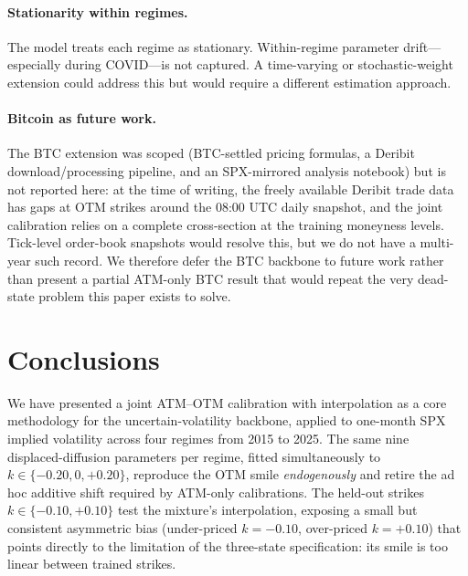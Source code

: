 \documentclass[12pt]{article}
\begin{document}
\paragraph{Stationarity within regimes.} The model treats each regime as stationary. Within-regime parameter drift---especially during COVID---is not captured. A time-varying or stochastic-weight extension could address this but would require a different estimation approach.

\paragraph{Bitcoin as future work.} The BTC extension was scoped (BTC-settled pricing formulas, a Deribit download/processing pipeline, and an SPX-mirrored analysis notebook) but is not reported here: at the time of writing, the freely available Deribit trade data has gaps at OTM strikes around the 08:00 UTC daily snapshot, and the joint calibration relies on a complete cross-section at the training moneyness levels. Tick-level order-book snapshots would resolve this, but we do not have a multi-year such record. We therefore defer the BTC backbone to future work rather than present a partial ATM-only BTC result that would repeat the very dead-state problem this paper exists to solve.


\section{Conclusions}
\label{sec:conclusion}

We have presented a joint ATM--OTM calibration with interpolation as a core methodology for the uncertain-volatility backbone, applied to one-month SPX implied volatility across four regimes from 2015 to 2025. The same nine displaced-diffusion parameters per regime, fitted simultaneously to $k \in \{-0.20, 0, +0.20\}$, reproduce the OTM smile \emph{endogenously} and retire the ad hoc additive shift required by ATM-only calibrations. The held-out strikes $k \in \{-0.10, +0.10\}$ test the mixture's interpolation, exposing a small but consistent asymmetric bias (under-priced $k=-0.10$, over-priced $k=+0.10$) that points directly to the limitation of the three-state specification: its smile is too linear between trained strikes.
\end{document}
